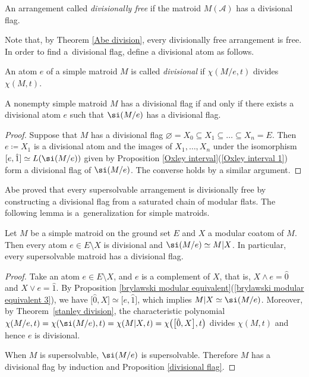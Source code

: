 \begin{Definition}\label{definition divisional freeness}
An arrangement called \textit{divisionally free} if the matroid $ M(\mathcal{A}) $ has a divisional flag.
\end{Definition}
Note that, by Theorem \ref{Abe division}, every divisionally free arrangement is free. In order to find a~divisional flag, define a divisional atom as follows.

\begin{Definition}An atom $ e $ of a simple matroid $ M $ is called \textit{divisional} if $ \chi(M/e,t) $ divides $ \chi(M,t) $.
\end{Definition}

\begin{Proposition}\label{divisional flag}
A nonempty simple matroid $ M $ has a divisional flag if and only if there exists a divisional atom $ e $ such that $ \si(M/e) $ has a divisional flag.
\end{Proposition}
\begin{proof}
Suppose that $ M $ has a divisional flag $ \varnothing = X_{0} \subseteq X_{1} \subseteq \dots \subseteq X_{n} = E $.
Then $ e \coloneqq X_{1} $ is a divisional atom and the images of $ X_{1}, \dots, X_{n} $ under the isomorphism $ [e, \hat{1}] \simeq L(\si(M/e)) $ given by Proposition \ref{Oxley interval}(\ref{Oxley interval 1}) form a divisional flag of $ \si(M/e) $.
The converse holds by a similar argument.
\end{proof}

Abe \cite[Proposition 5]{abe2017restrictions-pilt} proved that every supersolvable arrangement is divisionally free by constructing a divisional flag from a saturated chain of modular flats. The following lemma is a~generalization for simple matroids.

\begin{Lemma}\label{modular coatom divisional}
Let $ M $ be a simple matroid on the ground set $ E $ and $ X $ a modular coatom of $ M $.
Then every atom $ e \in E \setminus X $ is divisional and $ \si(M/e) \simeq M|X $.
In particular, every supersolvable matroid has a divisional flag.
\end{Lemma}
\begin{proof}
Take an atom $ e \in E\setminus X $, and $ e $ is a complement of $ X $, that is, $ X \wedge e = \hat{0} $ and $ X \vee e = \hat{1} $.
By Proposition \ref{brylawski modular equivalent}(\ref{brylawski modular equivalent 3}), we have $ \big[\hat{0}, X\big] \simeq \big[e, \hat{1}\big] $, which implies $ M|X \simeq \si(M/e) $.
Moreover, by Theo\-rem~\ref{stanley division}, the characteristic polynomial $ \chi(M/e,t) = \chi(\si(M/e),t) = \chi(M|X,t) = \chi\big(\big[\hat{0}, X\big], t\big) $ divides $ \chi(M,t) $ and hence $ e $ is divisional.

When $ M $ is supersolvable, $ \si(M/e) $ is supersolvable.
Therefore $ M $ has a divisional flag by induction and Proposition \ref{divisional flag}.
\end{proof}

